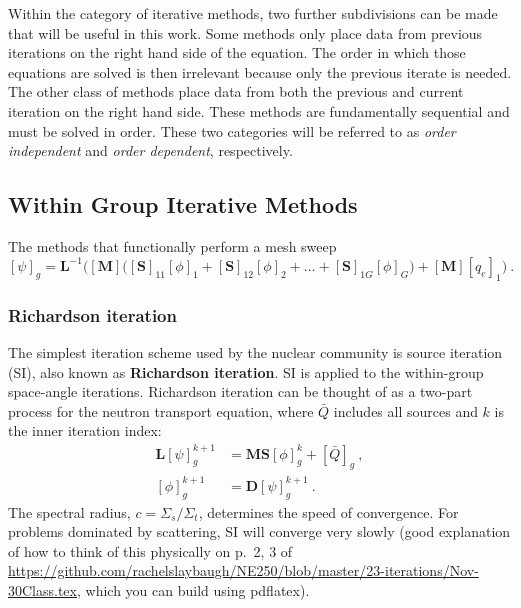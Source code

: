 \documentclass[12pt]{article}
\newcommand{\ve}[1]{\ensuremath{\mathbf{#1}}}
\newcommand{\Macro}{\ensuremath{\Sigma}}
\begin{document}
Within the category of iterative methods, two further subdivisions can be made that will be useful in this work. Some methods only place data from previous iterations on the right hand side of the equation. The order in which those equations are solved is then irrelevant because only the previous iterate is needed. The other class of methods place data from both the previous and current iteration on the right hand side. These methods are fundamentally sequential and must be solved in order. These two categories will be referred to as \textit{order independent} and \textit{order dependent}, respectively. 

\subsection*{Within Group Iterative Methods}
The methods that functionally perform a mesh sweep
\[
[\psi]_g = \ve{L}^{-1}\bigl([\ve{M}]\bigl([\ve{S}]_{11}[\phi]_1 + 
    [\ve{S}]_{12}[\phi]_2 + \ldots + [\ve{S}]_{1G}[\phi]_G\bigr) + 
    [\ve{M}][q_{e}]_1\bigr)\:.
\]
\subsubsection*{Richardson iteration}
The simplest iteration scheme used by the nuclear community is source iteration (SI), also known as \textbf{Richardson iteration}. SI is applied to the within-group space-angle iterations. Richardson iteration can be thought of as a two-part process for the neutron transport equation, where $\bar{Q}$ includes all sources and $k$ is the inner iteration index:
%
\begin{align}
  \ve{L}[\psi]_g^{k+1} &= \ve{MS} [\phi]_g^k + [\bar{Q}]_{g} \:,   \label{eq:SIpsi} \\
  [\phi]_g^{k+1} &= \ve{D}[\psi]_g^{k+1} \:.
  \label{eq:SIphi}
\end{align}
%
The spectral radius, $c = \Macro_s / \Macro_t$, determines the speed of convergence. For problems dominated by scattering, SI will converge very slowly (good explanation of how to think of this physically on p.\ 2, 3 of  \href{https://github.com/rachelslaybaugh/NE250/blob/master/23-iterations/Nov-30Class.tex}{https://github.com/rachelslaybaugh/NE250/blob/master/23-iterations/Nov-30Class.tex}, which you can build using pdflatex). 

\end{document}

